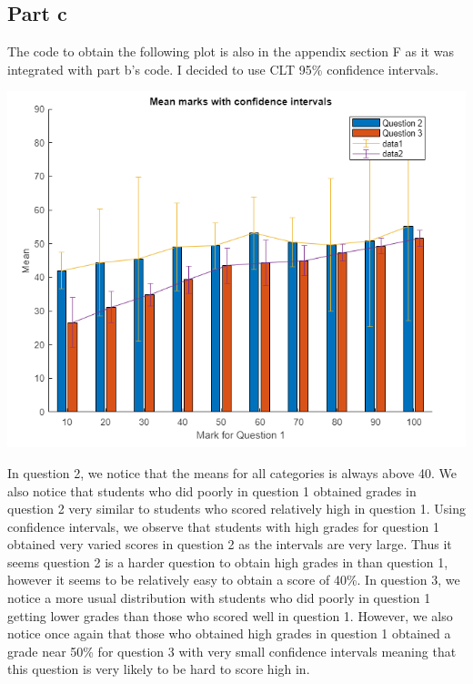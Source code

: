 \documentclass[10pt]{article}
\begin{document}
\subsection*{Part c}
The code to obtain the following plot is also in the appendix section F as it was integrated with part b's code.
I decided to use CLT 95\% confidence intervals.
\begin{center}
    \includegraphics[scale=0.45]{final_c}
\end{center}
In question 2, we notice that the means for all categories is always above
40. We also notice that students who did poorly in question 1 obtained grades in question 2 very similar 
to students who scored relatively high in question 1. 
Using confidence intervals, we observe that students with high grades for question
1 obtained very varied scores in question 2 as the intervals are very large. 
Thus it seems question 2 is a harder question to obtain high grades in than question 1, however it seems to be 
relatively easy to obtain a score of 40\%. 
In question 3, we notice a more usual distribution with students who did poorly in question 1 getting lower grades than
those who scored well in question 1. However, we also notice once again that those who obtained high grades
in question 1 obtained a grade near 50\% for question 3 with very small confidence intervals meaning
that this question is very likely to be hard to score high in.
\end{document}
